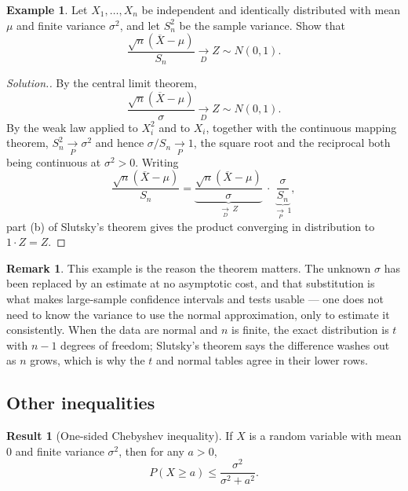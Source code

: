 \documentclass[11pt,a4paper]{article}
\theoremstyle{definition}
\newtheorem{exa}[thm]{Example}
\newtheorem{result}[thm]{Result}
\newtheorem*{remark}{Remark}
\newenvironment{solution}
  {\renewcommand{\qedsymbol}{}\begin{proof}[\textit{Solution}.]}
  {\end{proof}}
\begin{document}
\begin{exa}
Let $X_1,\dots,X_n$ be independent and identically distributed with mean $\mu$
and finite variance $\sigma^{2}$, and let $S_n^{2}$ be the sample variance. Show
that
$$\frac{\sqrt{n}\left(\overline{X}-\mu\right)}{S_n}
\underset{D}{\longrightarrow} Z\sim N(0,1).$$
\end{exa}

\begin{solution}
By the central limit theorem,
$$\frac{\sqrt{n}\left(\overline{X}-\mu\right)}{\sigma}
\underset{D}{\longrightarrow} Z\sim N(0,1).$$
By the weak law applied to $X_i^{2}$ and to $X_i$, together with the continuous
mapping theorem, $S_n^{2}\underset{P}{\longrightarrow}\sigma^{2}$ and hence
$\sigma/S_n \underset{P}{\longrightarrow} 1$, the square root and the reciprocal
both being continuous at $\sigma^{2}>0$. Writing
$$\frac{\sqrt{n}\left(\overline{X}-\mu\right)}{S_n}
= \underbrace{\frac{\sqrt{n}\left(\overline{X}-\mu\right)}{\sigma}}_{\underset{D}{\longrightarrow}\,Z}
\ \cdot\ \underbrace{\frac{\sigma}{S_n}}_{\underset{P}{\longrightarrow}\,1},$$
part (b) of Slutsky's theorem gives the product converging in distribution to
$1\cdot Z = Z$.
\end{solution}

\begin{remark}
This example is the reason the theorem matters. The unknown $\sigma$ has been
replaced by an estimate at no asymptotic cost, and that substitution is what
makes large-sample confidence intervals and tests usable --- one does not need
to know the variance to use the normal approximation, only to estimate it
consistently. When the data are normal and $n$ is finite, the exact distribution
is $t$ with $n-1$ degrees of freedom; Slutsky's theorem says the difference washes out as
$n$ grows, which is why the $t$ and normal tables agree in their lower rows.
\end{remark}

\subsection{Other inequalities}
\begin{result}[One-sided Chebyshev inequality]\label{res:one-sided}
If $X$ is a random variable with mean $0$ and finite variance $\sigma^2$, then for any $a > 0$,
\[
P(X \ge a) \le \frac{\sigma^2}{\sigma^2 + a^2} .
\]
\end{result}
\end{document}
